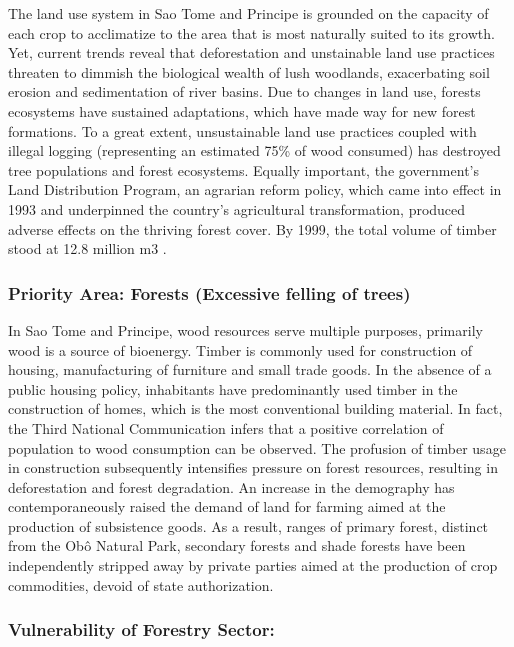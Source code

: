 \documentclass[
]{book}
\begin{document}
The land use system in Sao Tome and Principe is grounded on the capacity of each crop to acclimatize to the area that is most naturally suited to its growth. Yet, current trends reveal that deforestation and unstainable land use practices threaten to dimmish the biological wealth of lush woodlands, exacerbating soil erosion and sedimentation of river basins. Due to changes in land use, forests ecosystems have sustained adaptations, which have made way for new forest formations. To a great extent, unsustainable land use practices coupled with illegal logging (representing an estimated 75\% of wood consumed) has destroyed tree populations and forest ecosystems. Equally important, the government's Land Distribution Program, an agrarian reform policy, which came into effect in 1993 and underpinned the country's agricultural transformation, produced adverse effects on the thriving forest cover. By 1999, the total volume of timber stood at 12.8 million m3 .

\hypertarget{priority-area-forests-excessive-felling-of-trees}{%
\subsubsection{Priority Area: Forests (Excessive felling of trees)}\label{priority-area-forests-excessive-felling-of-trees}}

In Sao Tome and Principe, wood resources serve multiple purposes, primarily wood is a source of bioenergy. Timber is commonly used for construction of housing, manufacturing of furniture and small trade goods. In the absence of a public housing policy, inhabitants have predominantly used timber in the construction of homes, which is the most conventional building material. In fact, the Third National Communication infers that a positive correlation of population to wood consumption can be observed. The profusion of timber usage in construction subsequently intensifies pressure on forest resources, resulting in deforestation and forest degradation. An increase in the demography has contemporaneously raised the demand of land for farming aimed at the production of subsistence goods. As a result, ranges of primary forest, distinct from the Obô Natural Park, secondary forests and shade forests have been independently stripped away by private parties aimed at the production of crop commodities, devoid of state authorization.

\hypertarget{vulnerability-of-forestry-sector}{%
\subsubsection{Vulnerability of Forestry Sector:}\label{vulnerability-of-forestry-sector}}
\end{document}
